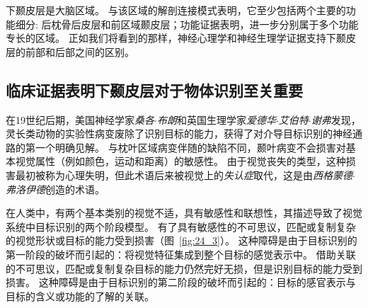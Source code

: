 下颞皮层是大脑区域。
与该区域的解剖连接模式表明，它至少包括两个主要的功能细分: 后枕骨后皮层和前区域颞皮层；功能证据表明，进一步分别属于多个功能专长的区域。
正如我们将看到的那样，神经心理学和神经生理学证据支持下颞皮层的前部和后部之间的区别。



\subsection{临床证据表明下颞皮层对于物体识别至关重要}

在19世纪后期，美国神经学家\textit{桑各$\cdot$布朗}和英国生理学家\textit{爱德华$\cdot$艾伯特$\cdot$谢弗}发现，灵长类动物的实验性病变废除了识别目标的能力，获得了对介导目标识别的神经通路的第一个明确见解。
与枕叶区域病变伴随的缺陷不同，颞叶病变不会损害对基本视觉属性（例如颜色，运动和距离）的敏感性。
由于视觉丧失的类型，这种损害最初被称为心理失明，但此术语后来被视觉上的\textit{失认症}取代，这是由\textit{西格蒙德$\cdot$弗洛伊德}创造的术语。


在人类中，有两个基本类别的视觉不适，具有敏感性和联想性，其描述导致了视觉系统中目标识别的两个阶段模型。
有了具有敏感性的不可思议，匹配或复制复杂的视觉形状或目标的能力受到损害（图~\ref{fig:24_3}）。
这种障碍是由于目标识别的第一阶段的破坏而引起的：将视觉特征集成到整个目标的感觉表示中。
借助关联的不可思议，匹配或复制复杂目标的能力仍然完好无损，但是识别目标的能力受到损害。
这种障碍是由于目标识别的第二阶段的破坏而引起的：目标的感官表示与目标的含义或功能的了解的关联。


